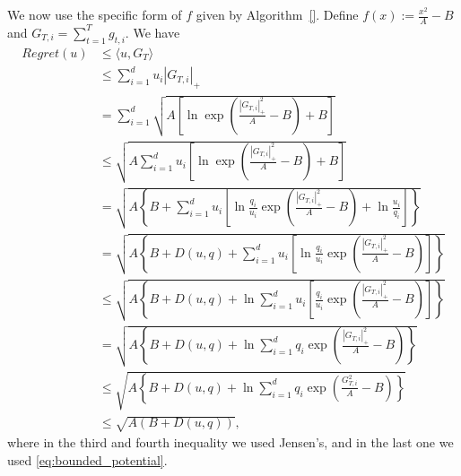 We now use the specific form of $f$ given by Algorithm~\ref{}.
Define $f(x):= \frac{x^2}{A} - B$ and $G_{T,i}=\sum_{t=1}^T g_{t,i}$.
We have
\begin{align*}
Regret(u) &\leq \langle u, G_T \rangle \\
&\leq \sum_{i=1}^d u_i |G_{T,i}|_+ \\
&= \sum_{i=1}^d \sqrt{A \left[\ln \exp\left(\frac{|G_{T,i}|_+^2}{A}-B\right)+B \right]} \\
&\leq  \sqrt{A \sum_{i=1}^d u_i \left[\ln \exp\left(\frac{|G_{T,i}|_+^2}{A}-B\right)+B \right]} \\
&=  \sqrt{A \left\{B+\sum_{i=1}^d u_i \left[\ln \frac{q_i}{u_i}\exp\left(\frac{|G_{T,i}|_+^2}{A}-B\right) + \ln \frac{u_i}{q_i}\right]\right\}} \\
&=  \sqrt{A \left\{B+D(u,q)+\sum_{i=1}^d u_i \left[\ln \frac{q_i}{u_i}\exp\left(\frac{|G_{T,i}|_+^2}{A}-B\right)\right]\right\}} \\
&\leq  \sqrt{A \left\{B+D(u,q)+ \ln \sum_{i=1}^d u_i \left[ \frac{q_i}{u_i}\exp\left(\frac{|G_{T,i}|_+^2}{A}-B\right)\right]\right\}} \\
&=  \sqrt{A \left\{B+D(u,q)+ \ln \sum_{i=1}^d q_i\exp\left(\frac{|G_{T,i}|_+^2}{A}-B\right)\right\}} \\
&\leq  \sqrt{A \left\{B+D(u,q)+ \ln \sum_{i=1}^d q_i\exp\left(\frac{G_{T,i}^2}{A}-B\right)\right\}} \\
&\leq  \sqrt{A \left(B+D(u,q)\right)},
\end{align*}
where in the third and fourth inequality we used Jensen's, and in the last one we used \eqref{eq:bounded_potential}.